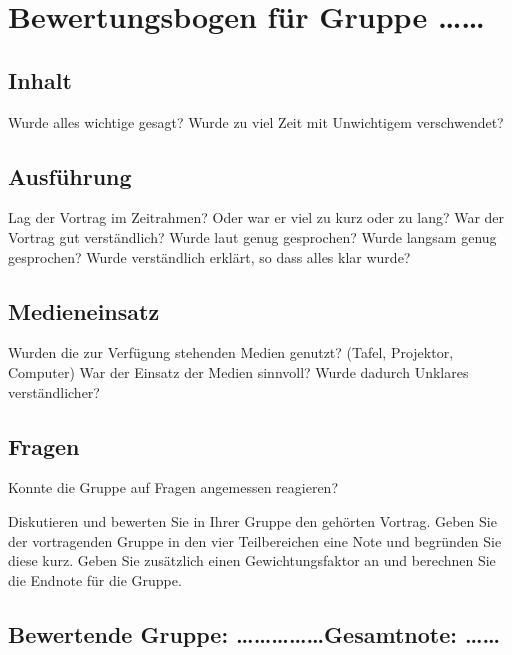 \documentclass[11pt,a5paper]{article}
\date{}
\begin{document}
\thispagestyle{empty}

\section*{Bewertungsbogen für Gruppe \ldots\ldots}

\subsection*{Inhalt} 
Wurde alles wichtige gesagt?
Wurde zu viel Zeit mit Unwichtigem verschwendet?

\subsection*{Ausführung}
Lag der Vortrag im Zeitrahmen? Oder war er viel zu kurz oder zu lang?
War der Vortrag gut verständlich? Wurde laut genug gesprochen? Wurde langsam genug gesprochen?
Wurde verständlich erklärt, so dass alles klar wurde?

\subsection*{Medieneinsatz}
Wurden die zur Verfügung stehenden Medien genutzt? (Tafel, Projektor, Computer)
War der Einsatz der Medien sinnvoll? Wurde dadurch Unklares verständlicher?

\subsection*{Fragen}
Konnte die Gruppe auf Fragen angemessen reagieren?


Diskutieren und bewerten Sie in Ihrer Gruppe den gehörten Vortrag.
Geben Sie der vortragenden Gruppe in den vier Teilbereichen eine Note und begründen Sie diese kurz.
Geben Sie zusätzlich einen Gewichtungsfaktor an und berechnen Sie die Endnote für die Gruppe.

\subsection*{Bewertende Gruppe: \ldots\ldots\ldots\ldots\ldots Gesamtnote: \ldots\ldots}
\end{document}
